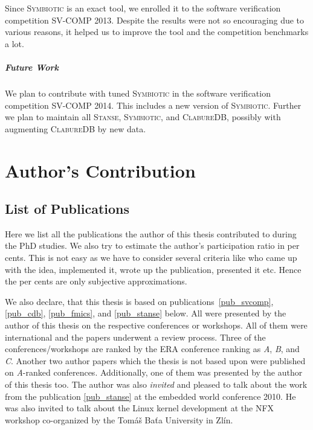 \documentclass[11pt,a4paper]{book}
\newcommand{\cdb}{\textsc{ClabureDB}\xspace}
\newcommand{\stan}{\textsc{Stanse}\xspace}
\newcommand{\symbio}{\textsc{Symbiotic}\xspace}
\begin{document}
Since \symbio is an exact tool, we enrolled it to the software verification
competition SV-COMP 2013. Despite the results were not so encouraging due to
various reasons, it helped us to improve the tool and the competition
benchmarks a lot.

\paragraph{Future Work}
We plan to contribute with tuned \symbio in the software verification
competition SV-COMP 2014. This includes a new version of \symbio. Further we
plan to maintain all \stan, \symbio, and \cdb, possibly with augmenting \cdb
by new data.



\clearpage


{}


\clearpage
\appendix
\chapter{Author's Contribution}
\section{List of Publications}
Here we list all the publications the author of this thesis contributed to
during the PhD studies. We also try to estimate the author's participation
ratio in per cents.  This is not easy as we have to consider several criteria
like who came up with the idea, implemented it, wrote up the publication,
presented it etc. Hence the per cents are only subjective approximations.

We also declare, that this thesis is based on publications~\ref{pub_svcomp},
\ref{pub_cdb}, \ref{pub_fmics}, and \ref{pub_stanse} below. All were presented
by the author of this thesis on the respective conferences or workshops.  All
of them were international and the papers underwent a review process.  Three
of the conferences/workshops are ranked by the ERA conference ranking as
\emph{A}, \emph{B}, and \emph{C}. Another two author papers which the thesis
is not based upon were published on \emph{A}-ranked conferences. Additionally,
one of them was presented by the author of this thesis too.  The author was
also \emph{invited} and pleased to talk about the work from the publication
\ref{pub_stanse} at the embedded world conference 2010. He was also invited to
talk about the Linux kernel development at the NFX workshop co-organized by
the Tomáš Baťa University in Zlín.
\end{document}
